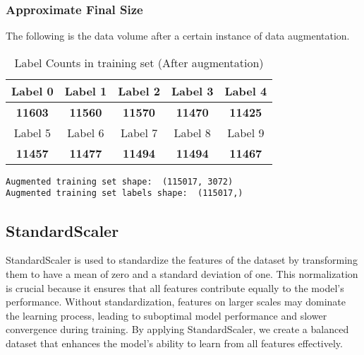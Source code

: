\documentclass[a4paper,11pt]{article}
\begin{document}
\subsubsection{Approximate Final Size}
The following is the data volume after a certain instance of data augmentation.

\begin{table}[h]
    \centering
    \begin{tabular}{|c|c|c|c|c|}
        \hline
        Label 0 & Label 1 & Label 2 & Label 3 & Label 4 \\
        \hline
        \textbf{11603} & \textbf{11560} & \textbf{11570} & \textbf{11470} & \textbf{11425} \\
        \hline
        Label 5 & Label 6 & Label 7 & Label 8 & Label 9 \\
        \hline
        \textbf{11457} & \textbf{11477} & \textbf{11494} & \textbf{11494} & \textbf{11467} \\
        \hline
    \end{tabular}
    \caption{Label Counts in training set (After augmentation)}
    \label{tab:example}
\end{table}

\begin{verbatim}
Augmented training set shape:  (115017, 3072)
Augmented training set labels shape:  (115017,)
\end{verbatim}

\subsection{StandardScaler}
StandardScaler is used to standardize the features of the dataset by transforming them to have a mean of zero and a standard deviation of one. This normalization is crucial because it ensures that all features contribute equally to the model's performance. Without standardization, features on larger scales may dominate the learning process, leading to suboptimal model performance and slower convergence during training. By applying StandardScaler, we create a balanced dataset that enhances the model's ability to learn from all features effectively.
\end{document}
